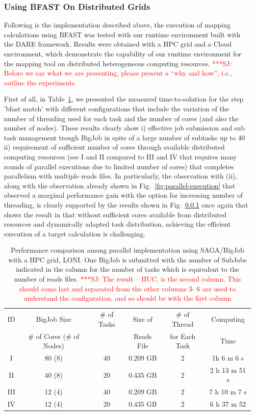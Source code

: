 \documentclass[12pt]{article}
\newcommand{\jhanote}[1]{ {\textcolor{red}     {***SJ: #1}}}
\newcommand{\jhanote}[1]{}
\begin{document}
\subsubsection{Using BFAST On Distributed Grids}

Following is the implementation described above, the execution of mapping calculations using BFAST was tested with our runtime environment built with the DARE framework.   Results were obtained with a HPC grid and a Cloud environment, which demonstrate the capability of our runtime environment for the mapping tool on distributed heterogeneous computing resources. \jhanote{Before we say what we are presenting, please present a ``why and how'', i.e., outline the experiments} 

First of all, in Table~\ref{table:bigjob-loni}, we presented the measured time-to-solution for the step 'bfast match' with different configurations that include the variation of the number of threading used for each task and the number of cores (and also the number of nodes).   These results clearly show i) effective job submission and sub task management trough BigJob in spite of a large number of subtasks up to 40 ii) requirement of sufficient number of cores through available distributed computing resources (see I and II compared to III and IV that requires many rounds of parallel executions due to limited number of cores) that completes parallelism with multiple reads files.  In particularly, the observation with (ii), along with the observation already shown in Fig.~\ref{fig:parallel-execution} that observed a marginal performance gain with the option for increasing number of threading, is clearly supported by the results shown in Fig.~\ref{} once again that shows the result in that without sufficient cores available from distributed resources and dynamically adapted task distribution, achieving the efficient execution of a target calculation is challenging.


 \begin{table}
 \begin{tabular}{|ccccc|c |} 
 \hline 
ID & BigJob Size  &  \# of Tasks & Size of  & \# of Thread  &   Computing  \\
   & \# of Cores (\# of Nodes) &  & Reads File & for Each Task &  Time\\\hline
I   & 80  (8) &  40 & 0.209 GB & 2 & 1h 6 m 6 s \\
II  & 40 (8)  &  20 & 0.435 GB & 2 & 2 h 13 m 51 s\\
III & 12 (4)  & 40  & 0.209 GB & 2 & 7 h 10 m 7 s \\
IV & 12 (4)  & 20 & 0.435 GB & 2 &  6 h 37 m 52  \\
\hline
\end{tabular}
\caption{Performance comparison among parallel implementation using SAGA/BigJob with a HPC grid, LONI. One BigJob is submitted with the number of SubJobs indicated in the column for the number of tasks which is equivalent to the number of reads files.\jhanote{The result -- IIUC, is the second column. This should come last and separated from the other columns 3- 6 are used to understand the configuration, and so should be with the first column}}
  \label{table:bigjob-loni} 
\end{table}
 
\end{document}
